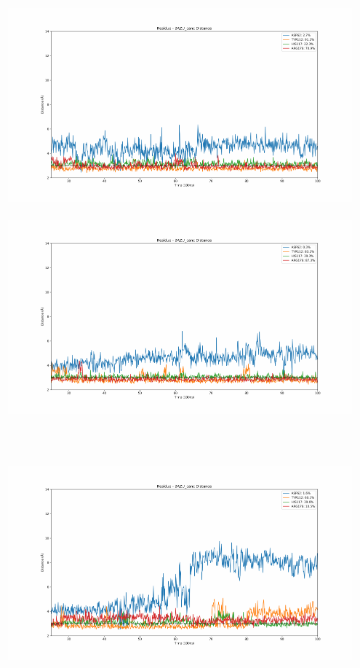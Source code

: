 \documentclass[fleqn,10pt]{wlscirep}
\begin{document}
\begin{figure}[!ht]
\centering
  \begin{subfigure}{.45\textwidth}
     \centering
     \includegraphics[width=.95\linewidth]{2AZU_canc/2AZU_canc-dist_0.pdf}
  \end{subfigure}
  \begin{subfigure}{.45\textwidth}
     \centering
     \includegraphics[width=.95\linewidth]{2AZU_canc/2AZU_canc-dist_1.pdf}
  \end{subfigure}
  \\
  \begin{subfigure}{.45\textwidth}
     \centering
     \includegraphics[width=.95\linewidth]{2AZU_canc/2AZU_canc-dist_2.pdf}

\end{subfigure}
\end{figure}
\end{document}
